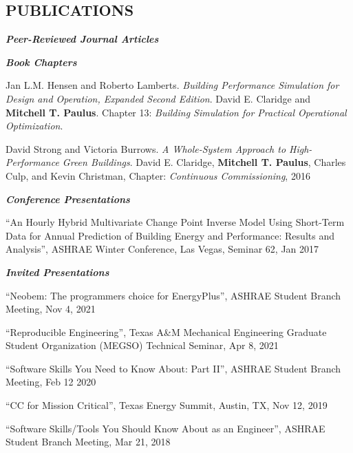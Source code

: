 \documentclass[margin]{res} %
\begin{document}
\begin{resume}
\section{PUBLICATIONS}
{\sl \textbf{Peer-Reviewed Journal Articles}}









{\sl \textbf{Book Chapters}}

Jan L.M. Hensen and Roberto Lamberts. \textit{Building Performance Simulation
for Design and Operation, Expanded Second Edition}. David E. Claridge
and \textbf{Mitchell T. Paulus}. Chapter 13: \textit{Building Simulation
for Practical Operational Optimization}.

David Strong and Victoria Burrows. \textit{A Whole-System Approach to High-Performance Green Buildings}. David E. Claridge, \textbf{Mitchell T. Paulus}, Charles Culp, and Kevin Christman, Chapter: \textit{Continuous Commissioning\textsuperscript{\textregistered{}}}, 2016

\textbf{\textit{Conference Presentations}}

``An Hourly Hybrid Multivariate Change Point Inverse  Model Using Short-Term Data for Annual Prediction of Building Energy and Performance: Results and Analysis'', ASHRAE Winter Conference, Las Vegas, Seminar 62, Jan 2017

\textbf{\textit{Invited Presentations}}

``Neobem: The programmers choice for EnergyPlus'', ASHRAE Student Branch Meeting, Nov 4, 2021

``Reproducible Engineering'', Texas A\&M Mechanical Engineering Graduate
Student Organization (MEGSO) Technical Seminar, Apr 8, 2021

``Software Skills You Need to Know About: Part II'', ASHRAE Student Branch Meeting, Feb 12 2020

``CC\textsuperscript{\textregistered{}} for Mission Critical'', Texas Energy Summit, Austin, TX, Nov 12, 2019

``Software Skills/Tools You Should Know About as an Engineer'', ASHRAE Student Branch Meeting, Mar 21, 2018


\end{resume}
\end{document}
